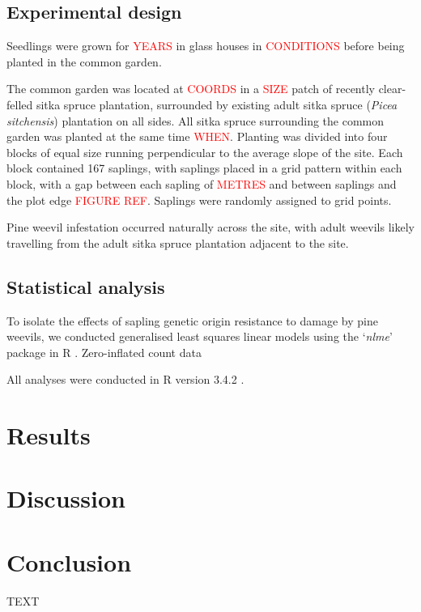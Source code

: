 \documentclass[a4paper, 11pt]{article}
\newcommand{\todo}[1]{\textcolor{red}{#1}}   %
\begin{document}
\subsection*{Experimental design}

Seedlings were grown for \todo{YEARS} in glass houses in \todo{CONDITIONS} before being planted in the common garden.

The common garden was located at \todo{COORDS} in a \todo{SIZE} patch of recently clear-felled sitka spruce plantation, surrounded by existing adult sitka spruce (\textit{Picea sitchensis}) plantation on all sides. All sitka spruce surrounding the common garden was planted at the same time \todo{WHEN}. Planting was divided into four blocks of equal size running perpendicular to the average slope of the site. Each block contained 167 saplings, with saplings placed in a grid pattern within each block, with a gap between each sapling of \todo{METRES} and between saplings and the plot edge \todo{FIGURE REF}. Saplings were randomly assigned to grid points.

Pine weevil infestation occurred naturally across the site, with adult weevils likely travelling from the adult sitka spruce plantation adjacent to the site. 

\subsection*{Statistical analysis}

To isolate the effects of sapling genetic origin resistance to damage by pine weevils, we conducted generalised least squares linear models using the `\textit{nlme}' package in R \citep{Pinheiro2018}. Zero-inflated count data 


All analyses were conducted in R version 3.4.2 \citep{RCoreTeam2017}.


\section*{Results}

\section*{Discussion}

\section*{Conclusion}

TEXT

\end{document}
